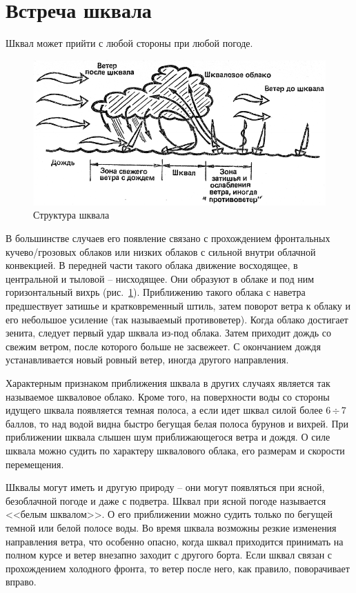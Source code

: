 \documentclass[a4paper, 12pt, twoside, final, book, russian, fittopage, cyremdash]{ncc}
\newcommand{\otdo}{\,\ensuremath{\div}\,}
\newcommand{\ris}[1]{\ref{fig:#1}}
\begin{document}
\section{Встреча шквала}

Шквал может прийти с любой стороны при любой погоде.

\begin{figure}[htb]
  \centering{}
  \includegraphics[scale=1.3]{0136P}
  \caption{Структура шквала}
  \label{fig:136}
\end{figure}

В большинстве случаев его появление связано с прохождением фронтальных кучево\-/грозовых облаков или низких облаков с сильной внутри облачной конвекцией. В передней части такого облака движение восходящее, в центральной и тыловой \--- нисходящее. Они образуют в облаке и под ним горизонтальный вихрь (рис.~\ris{136}). Приближению такого облака с наветра предшествует затишье и кратковременный штиль, затем поворот ветра к облаку и его небольшое усиление (так называемый противоветер). Когда облако достигает зенита, следует первый удар шквала из-под облака. Затем приходит дождь со свежим ветром, после которого больше не засвежеет. С окончанием дождя устанавливается новый ровный ветер, иногда другого направления.

Характерным признаком приближения шквала в других случаях является так называемое шкваловое облако. Кроме того, на поверхности воды со стороны идущего шквала появляется темная полоса, а если идет шквал силой более 6\otdo 7 баллов, то над водой видна быстро бегущая белая полоса бурунов и вихрей. При приближении шквала слышен шум приближающегося ветра и дождя. О силе шквала можно судить по характеру шквалового облака, его размерам и скорости перемещения.

Шквалы могут иметь и другую природу \--- они могут появляться при ясной, безоблачной погоде и даже с подветра. Шквал при ясной погоде называется <<белым шквалом>>. О его приближении можно судить только по бегущей темной или белой полосе воды. Во время шквала возможны резкие изменения направления ветра, что особенно опасно, когда шквал приходится принимать на полном курсе и ветер внезапно заходит с другого борта. Если шквал связан с прохождением холодного фронта, то ветер после него, как правило, поворачивает вправо. 
\end{document}
